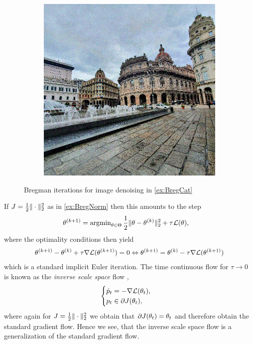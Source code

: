 \begin{figure}
\begin{minipage}{\textwidth}
\begin{subfigure}{.3\textwidth}
%
\end{subfigure}\hfill%
\begin{subfigure}{.3\textwidth}%
\includegraphics[width=\textwidth]{atelier/breg_cat/data.png}
\end{subfigure}%
\end{minipage}%
%
\caption{Bregman iterations for image denoising in \cref{ex:BregCat}}\label{fig:BregCat}
\end{figure}%
%
%
\noindent
If $J=\frac{1}{2}\|\cdot\|_2^2$ as in \cref{ex:BregNorm} then this amounts to the step
%
\begin{align*}
\theta^{(k+1)} &= \operatorname{argmin}_{\theta\in\Theta} \frac{1}{2}\|\theta - \theta^{(k)}\|^2_2 + \tau^{}\mathcal{L}(\theta),
\end{align*}
%
where the optimality conditions then yield
%
\begin{align*}
\theta^{(k+1)} - \theta^{(k)} + \tau \nabla \mathcal{L}(\theta^{(k+1)}) = 0
\Leftrightarrow \theta^{(k+1)}= \theta^{(k)} - \tau \nabla \mathcal{L}(\theta^{(k+1)})
\end{align*}
%
which is a standard implicit Euler iteration. The time continuous flow for $\tau\to 0$ is known as the \emph{inverse scale space} flow \cite{burger2006nonlinear,burger2007inverse},
%
\begin{align*}
\begin{cases}
    \dot{p}_t = - \nabla\mathcal{L}(\theta_t), \\
    p_t \in \partial J(\theta_t),
\end{cases}
\end{align*}
%
where again for $J=\frac{1}{2}\|\cdot\|_2^2$ we obtain that $\partial J(\theta_t) = \theta_t$ and therefore obtain the standard gradient flow. Hence we see, that the inverse scale space flow is a generalization of the standard gradient flow. 
%
%
%
